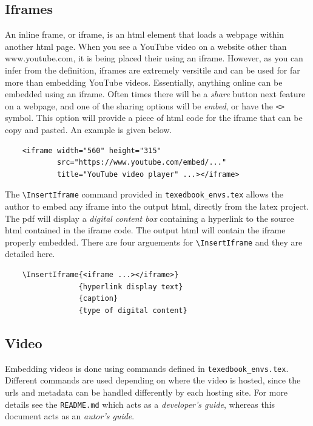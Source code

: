 \documentclass{article}
\begin{document}
\subsection{Iframes}
An inline frame, or iframe, is an html element that loads a webpage within another html page. When you see a YouTube video on a website other than www.youtube.com, it is being placed their using an iframe. However, as you can infer from the definition, iframes are extremely versitile and can be used for far more than embedding YouTube videos. Essentially, anything online can be embedded using an iframe. Often times there will be a \textit{share} button next feature on a webpage, and one of the sharing options will be \textit{embed}, or have the \verb'<>' symbol. This option will provide a piece of html code for the iframe that can be copy and pasted. An example is given below. 

\begin{verbatim}
    <iframe width="560" height="315" 
            src="https://www.youtube.com/embed/..." 
            title="YouTube video player" ...></iframe>
\end{verbatim}

The \verb'\InsertIframe' command provided in \verb'texedbook_envs.tex' allows the author to embed any iframe into the output html, directly from the latex project. The pdf will display a \textit{digital content box} containing a hyperlink to the source html contained in the iframe code. The output html will contain the iframe properly embedded. There are four arguements for \verb'\InsertIframe' and they are detailed here.
\begin{verbatim}
    \InsertIframe{<iframe ...></iframe>}
                 {hyperlink display text}
                 {caption}
                 {type of digital content}
\end{verbatim}  




\subsection{Video}
Embedding videos is done using commands defined in \verb'texedbook_envs.tex'. Different commands are used depending on where the video is hosted, since the urls and metadata can be handled differently by each hosting site. For more details see the \verb'README.md' which acts as a \textit{developer's guide}, whereas this document acts as an \textit{autor's guide}.
\end{document}
